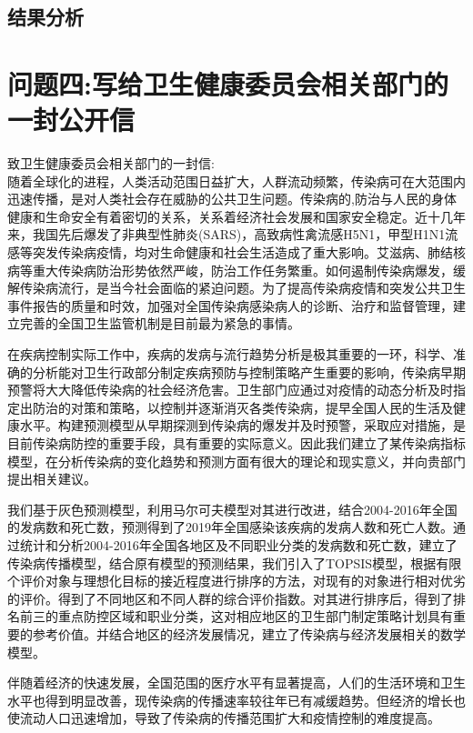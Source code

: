 \documentclass{whutmod}
\begin{document}
     
     \subsection{结果分析}
     
     
    \section{问题四:写给卫生健康委员会相关部门的一封公开信}
    致卫生健康委员会相关部门的一封信:
    ~\\
    
    随着全球化的进程，人类活动范围日益扩大，人群流动频繁，传染病可在大范围内迅速传播，是对人类社会存在威胁的公共卫生问题。传染病的,防治与人民的身体健康和生命安全有着密切的关系，关系着经济社会发展和国家安全稳定。近十几年来，我国先后爆发了非典型性肺炎(SARS)，高致病性禽流感H5N1，甲型H1N1流感等突发传染病疫情，均对生命健康和社会生活造成了重大影响。艾滋病、肺结核病等重大传染病防治形势依然严峻，防治工作任务繁重。如何遏制传染病爆发，缓解传染病流行，是当今社会面临的紧迫问题。为了提高传染病疫情和突发公共卫生事件报告的质量和时效，加强对全国传染病感染病人的诊断、治疗和监督管理，建立完善的全国卫生监管机制是目前最为紧急的事情。
    
    在疾病控制实际工作中，疾病的发病与流行趋势分析是极其重要的一环，科学、准确的分析能对卫生行政部分制定疾病预防与控制策略产生重要的影响，传染病早期预警将大大降低传染病的社会经济危害。卫生部门应通过对疫情的动态分析及时指定出防治的对策和策略，以控制并逐渐消灭各类传染病，提早全国人民的生活及健康水平。构建预测模型从早期探测到传染病的爆发并及时预警，采取应对措施，是目前传染病防控的重要手段，具有重要的实际意义。因此我们建立了某传染病指标模型，在分析传染病的变化趋势和预测方面有很大的理论和现实意义，并向贵部门提出相关建议。
    
    我们基于灰色预测模型，利用马尔可夫模型对其进行改进，结合2004-2016年全国的发病数和死亡数，预测得到了2019年全国感染该疾病的发病人数和死亡人数。通过统计和分析2004-2016年全国各地区及不同职业分类的发病数和死亡数，建立了传染病传播模型，结合原有模型的预测结果，我们引入了TOPSIS模型，根据有限个评价对象与理想化目标的接近程度进行排序的方法，对现有的对象进行相对优劣的评价。得到了不同地区和不同人群的综合评价指数。对其进行排序后，得到了排名前三的重点防控区域和职业分类，这对相应地区的卫生部门制定策略计划具有重要的参考价值。并结合地区的经济发展情况，建立了传染病与经济发展相关的数学模型。
    
    伴随着经济的快速发展，全国范围的医疗水平有显著提高，人们的生活环境和卫生水平也得到明显改善，现传染病的传播速率较往年已有减缓趋势。但经济的增长也使流动人口迅速增加，导致了传染病的传播范围扩大和疫情控制的难度提高。 
    
\end{document}
